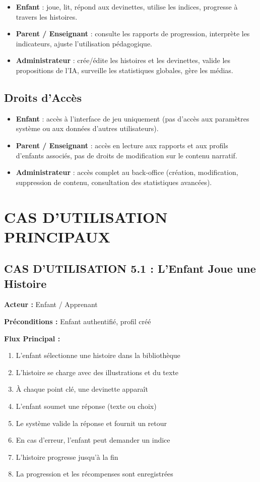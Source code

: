 \documentclass[12pt,a4paper]{article}
\begin{document}
\begin{itemize}
    \item \textbf{Enfant} : joue, lit, répond aux devinettes, utilise les indices, progresse à travers les histoires.
    \item \textbf{Parent / Enseignant} : consulte les rapports de progression, interprète les indicateurs, ajuste l'utilisation pédagogique.
    \item \textbf{Administrateur} : crée/édite les histoires et les devinettes, valide les propositions de l'IA, surveille les statistiques globales, gère les médias.
\end{itemize}

\subsection{Droits d'Accès}

\begin{itemize}
    \item \textbf{Enfant} : accès à l'interface de jeu uniquement (pas d'accès aux paramètres système ou aux données d'autres utilisateurs).
    \item \textbf{Parent / Enseignant} : accès en lecture aux rapports et aux profils d'enfants associés, pas de droits de modification sur le contenu narratif.
    \item \textbf{Administrateur} : accès complet au back-office (création, modification, suppression de contenu, consultation des statistiques avancées).
\end{itemize}

\newpage

\section{CAS D'UTILISATION PRINCIPAUX}

\subsection{CAS D'UTILISATION 5.1 : L'Enfant Joue une Histoire}

\textbf{Acteur :} Enfant / Apprenant

\textbf{Préconditions :} Enfant authentifié, profil créé

\textbf{Flux Principal :}
\begin{enumerate}
    \item L'enfant sélectionne une histoire dans la bibliothèque
    \item L'histoire se charge avec des illustrations et du texte
    \item À chaque point clé, une devinette apparaît
    \item L'enfant soumet une réponse (texte ou choix)
    \item Le système valide la réponse et fournit un retour
    \item En cas d'erreur, l'enfant peut demander un indice
    \item L'histoire progresse jusqu'à la fin
    \item La progression et les récompenses sont enregistrées
\end{enumerate}
\end{document}

